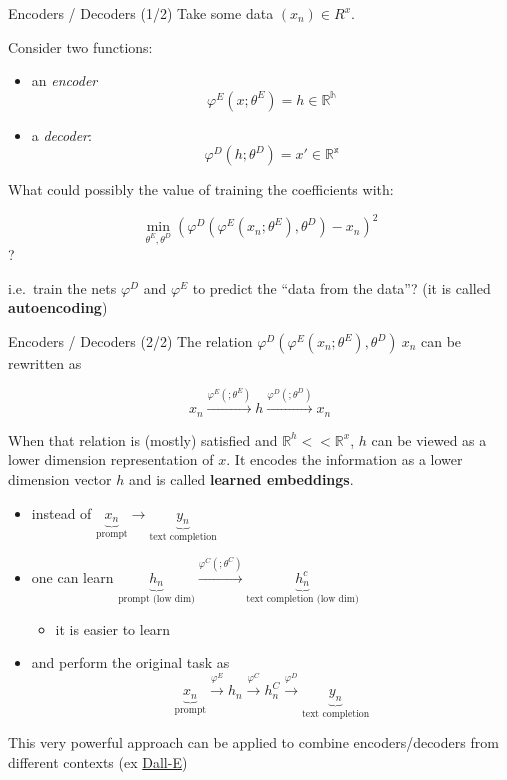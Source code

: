 \documentclass[
  ignorenonframetext,
]{beamer}
\providecommand{\tightlist}{%
  \setlength{\itemsep}{0pt}\setlength{\parskip}{0pt}}\usepackage{longtable,booktabs,array}
\begin{document}
\begin{frame}{Encoders / Decoders (1/2)}
\label{encoders-decoders-12}
Take some data \((x_n)\in R^x\).

Consider two functions:

\begin{itemize}
\tightlist
\item
  an \emph{encoder} \[\varphi^E(x; \theta^E) = h \in \mathbb{R^h}\]
\item
  a \emph{decoder}: \[\varphi^D(h; \theta^D) = x' \in \mathbb{R^x}\]
\end{itemize}

What could possibly the value of training the coefficients with:

\[\min_{\theta^E, \theta^D}  \left( \varphi^D( \varphi^E(x_n; \theta^E), \theta^D) - x_n\right)^2\]?

i.e.~train the nets \(\varphi^D\) and \(\varphi^E\) to predict the
``data from the data''? (it is called \textbf{autoencoding})
\end{frame}

\begin{frame}{Encoders / Decoders (2/2)}
\label{encoders-decoders-22}
The relation \(\varphi^D( \varphi^E(x_n; \theta^E), \theta^D) ~ x_n\)
can be rewritten as

\[x_n \xrightarrow{\varphi^E(; \theta^E)} h \xrightarrow{\varphi^D(; \theta^D)} x_n \]

When that relation is (mostly) satisfied and
\(\mathbb{R}^h << \mathbb{R}^x\), \(h\) can be viewed as a lower
dimension representation of \(x\). It encodes the information as a lower
dimension vector \(h\) and is called \textbf{learned embeddings}.

\begin{itemize}
\tightlist
\item
  instead of
  \(\underbrace{x_n}_{\text{prompt}} \rightarrow \underbrace{y_n}_{\text{text completion}}\)
\item
  one can learn
  \(\underbrace{h_n}_{\text{prompt (low dim)}} \xrightarrow{\varphi^C( ; \theta^C)} \underbrace{h_n^c}_{\text{text completion (low dim)}}\)

  \begin{itemize}
  \tightlist
  \item
    it is easier to learn
  \end{itemize}
\item
  and perform the original task as
  \[\underbrace{x_n}_{\text{prompt}} \xrightarrow{\varphi^E}  h_n \xrightarrow{\varphi^C} h_n^C \xrightarrow{\varphi^D} \underbrace{y_n}_{\text{text completion}}\]
\end{itemize}

This very powerful approach can be applied to combine encoders/decoders
from different contexts (ex \href{https://openai.com/dall-e-2}{Dall-E})
\end{frame}
\end{document}
